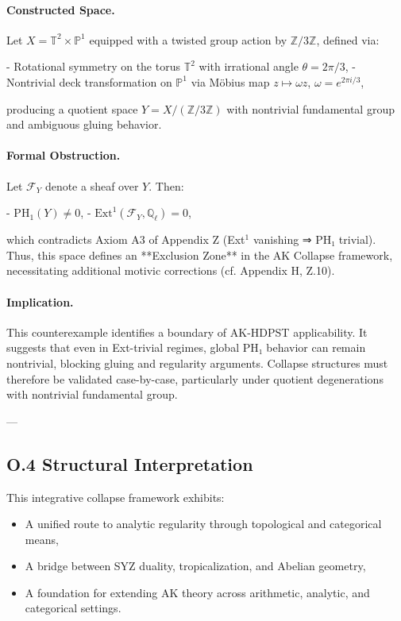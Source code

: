 \documentclass[11pt]{article}
\begin{document}
\begin{axiom}
\begin{axiom}
{{\paragraph{Constructed Space.}
Let \( X = \mathbb{T}^2 \times \mathbb{P}^1 \) equipped with a twisted group action by \( \mathbb{Z}/3\mathbb{Z} \), defined via:

- Rotational symmetry on the torus \( \mathbb{T}^2 \) with irrational angle \( \theta = 2\pi/3 \),
- Nontrivial deck transformation on \( \mathbb{P}^1 \) via Möbius map \( z \mapsto \omega z \), \( \omega = e^{2\pi i/3} \),

producing a quotient space \( Y = X / (\mathbb{Z}/3\mathbb{Z}) \) with nontrivial fundamental group and ambiguous gluing behavior.

\paragraph{Formal Obstruction.}
Let \( \mathcal{F}_Y \) denote a sheaf over \( Y \). Then:

- \( \mathrm{PH}_1(Y) \neq 0 \),
- \( \mathrm{Ext}^1(\mathcal{F}_Y, \mathbb{Q}_\ell) = 0 \),

which contradicts Axiom A3 of Appendix Z (Ext$^1$ vanishing ⇒ PH₁ trivial).  
Thus, this space defines an **Exclusion Zone** in the AK Collapse framework, necessitating additional motivic corrections (cf. Appendix H, Z.10).

\paragraph{Implication.}
This counterexample identifies a boundary of AK-HDPST applicability. It suggests that even in Ext-trivial regimes, global PH₁ behavior can remain nontrivial, blocking gluing and regularity arguments. Collapse structures must therefore be validated case-by-case, particularly under quotient degenerations with nontrivial fundamental group.


---

\subsection*{O.4 Structural Interpretation}

This integrative collapse framework exhibits:

\begin{itemize}
  \item A unified route to analytic regularity through topological and categorical means,
  \item A bridge between SYZ duality, tropicalization, and Abelian geometry,
  \item A foundation for extending AK theory across arithmetic, analytic, and categorical settings.
\end{itemize}

}}
\end{axiom}
\end{axiom}
\end{document}
